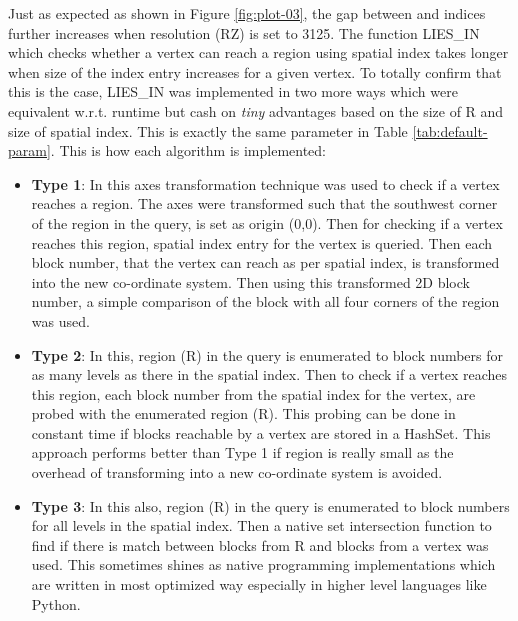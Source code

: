 Just as expected as shown in Figure \ref{fig:plot-03}, the gap between {\rrp} and {\rrpsocial} indices further increases when resolution (RZ) is set to 3125. The function LIES\_IN which checks whether a vertex can reach a region using spatial index takes longer when size of the index entry increases for a given vertex. To totally confirm that this is the case, LIES\_IN was implemented in two more ways which were equivalent w.r.t. runtime but cash on \textit{tiny} advantages based on the size of R and size of spatial index. This is exactly the same parameter {\vra} in Table \ref{tab:default-param}. This is how each algorithm is implemented:
\begin{itemize}
  \item \textbf{Type 1}: In this axes transformation technique was used to check if a vertex reaches a region. The axes were transformed such that the southwest corner of the region in the query, is set as origin (0,0). Then for checking if a vertex reaches this region, spatial index entry for the vertex is queried. Then each block number, that the vertex can reach as per spatial index, is transformed into the new co-ordinate system. Then using this transformed 2D block number, a simple comparison of the block with all four corners of the region was used.
  \item \textbf{Type 2}: In this, region (R) in the query is enumerated to block numbers for as many levels as there in the spatial index. Then to check if a vertex reaches this region, each block number from the spatial index for the vertex, are probed with the enumerated region (R). This probing can be done in constant time if blocks reachable by a vertex are stored in a HashSet. This approach performs better than Type 1 if region is really small as the overhead of transforming into a new co-ordinate system is avoided.
  \item \textbf{Type 3}: In this also, region (R) in the query is enumerated to block numbers for all levels in the spatial index. Then a native set intersection function to find if there is match between blocks from R and blocks from a vertex was used. This sometimes shines as native programming implementations which are written in most optimized way especially in higher level languages like Python.
\end{itemize}

